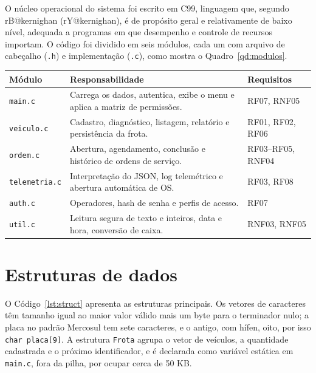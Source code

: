 \documentclass[12pt,a4paper,oneside]{report}
\makeatletter
\newcommand{\fonte}[1]{\par\vspace{2pt}{\small Fonte: #1}\par}
\newcommand{\citeonline}[1]{\csname rB@#1\endcsname{} (\csname rY@#1\endcsname)}
\makeatother
\begin{document}
O núcleo operacional do sistema foi escrito em C99, linguagem que, segundo
\citeonline{kernighan}, é de propósito geral e relativamente de baixo nível, adequada a programas em que
desempenho e controle de recursos importam. O código foi dividido em seis módulos, cada um com arquivo de
cabeçalho (\texttt{.h}) e implementação (\texttt{.c}), como mostra o Quadro~\ref{qd:modulos}.

\begin{quadro}[H]
  \caption{Módulos do programa em C}\label{qd:modulos}
  \small\singlespacing
  \renewcommand{\arraystretch}{1.25}
  \begin{tabularx}{\textwidth}{|>{\raggedright\arraybackslash}p{3.2cm}|X|>{\centering\arraybackslash}p{2.6cm}|}
    \hline
    \rowcolor{gray!15}\textbf{Módulo} & \textbf{Responsabilidade} & \textbf{Requisitos} \\ \hline
    \texttt{main.c} & Carrega os dados, autentica, exibe o menu e aplica a matriz de permissões. & RF07, RNF05 \\ \hline
    \texttt{veiculo.c} & Cadastro, diagnóstico, listagem, relatório e persistência da frota. & RF01, RF02, RF06 \\ \hline
    \texttt{ordem.c} & Abertura, agendamento, conclusão e histórico de ordens de serviço. & RF03--RF05, RNF04 \\ \hline
    \texttt{telemetria.c} & Interpretação do JSON, log telemétrico e abertura automática de OS. & RF03, RF08 \\ \hline
    \texttt{auth.c} & Operadores, hash de senha e perfis de acesso. & RF07 \\ \hline
    \texttt{util.c} & Leitura segura de texto e inteiros, data e hora, conversão de caixa. & RNF03, RNF05 \\ \hline
  \end{tabularx}
  \fonte{Elaborado pelo autor (2026).}
\end{quadro}

\section{Estruturas de dados}

O Código~\ref{lst:struct} apresenta as estruturas principais. Os vetores de caracteres têm tamanho igual ao
maior valor válido mais um byte para o terminador nulo; a placa no padrão Mercosul tem sete caracteres, e
o antigo, com hífen, oito, por isso \texttt{char placa[9]}. A estrutura \texttt{Frota} agrupa o vetor de
veículos, a quantidade cadastrada e o próximo identificador, e é declarada como variável estática em
\texttt{main.c}, fora da pilha, por ocupar cerca de 50 KB.
\end{document}

